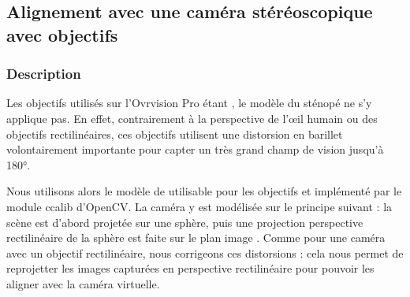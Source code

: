 \subsection{Alignement avec une caméra stéréoscopique avec objectifs }
\label{subsec:ovrvision_camera_calibration}

\subsubsection{Description}



Les objectifs utilisés sur l'Ovrvision Pro étant , le modèle du sténopé ne s'y applique pas. En effet, contrairement à la perspective de l'œil humain ou des objectifs rectilinéaires, ces objectifs utilisent une distorsion en barillet volontairement importante pour capter un très grand champ de vision jusqu'à \ang{180}.

Nous utilisons alors le modèle de \cite{Mei2007} utilisable pour les objectifs  et implémenté par le module ccalib d'OpenCV. La caméra y est modélisée sur le principe suivant : la scène est d'abord projetée sur une sphère, puis une projection perspective rectilinéaire de la sphère est faite sur le plan image . Comme pour une caméra avec un objectif rectilinéaire, nous corrigeons ces distorsions : cela nous permet de reprojetter les images capturées en perspective rectilinéaire pour pouvoir les aligner avec la caméra virtuelle.


